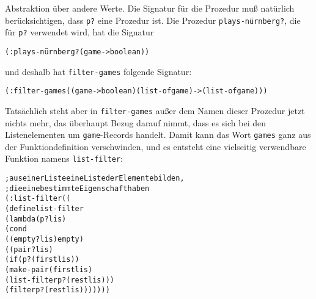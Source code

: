 Abstraktion über andere Werte.  Die Signatur für die Prozedur muß
natürlich berücksichtigen, dass \texttt{p?} eine Prozedur ist.  Die Prozedur
\texttt{plays-nürnberg?}, die für \texttt{p?}  verwendet wird, hat die
Signatur
%
\begin{alltt}
(: plays-nürnberg? (game -> boolean))
\end{alltt}
%
und deshalb hat \texttt{filter-games} folgende Signatur:
%
\begin{alltt}
(: filter-games ((game -> boolean) (list-of game) -> (list-of game)))
\end{alltt}
%
Tatsächlich steht aber in \texttt{filter-games} außer dem Namen dieser Prozedur
jetzt nichts mehr, das
überhaupt Bezug darauf nimmt, dass es sich bei den Listenelementen um
\texttt{game}-Records handelt.  %
Damit kann das Wort \texttt{games} ganz aus der Funktiondefinition
verschwinden, und es entsteht eine vielseitig verwendbare Funktion
namens \texttt{list-filter}:
%
\begin{alltt}
; aus einer Liste eine Liste der Elemente bilden,
; die eine bestimmte Eigenschaft haben
(: list-filter ((%a -> boolean) (list-of %a) -> (list-of %a)))
(define list-filter
  (lambda (p? lis)
    (cond
      ((empty? lis) empty)
      ((pair? lis)
       (if (p? (first lis))
           (make-pair (first lis)
                      (list-filter p? (rest lis)))
           (filter p? (rest lis)))))))
\end{alltt}


